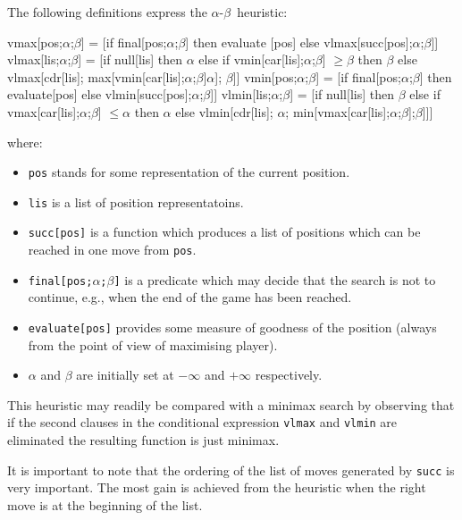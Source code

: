 \documentclass{tufte-handout}
\newcommand{\alphabeta}[0]{$\alpha$-$\beta$~}
\begin{document}
The following definitions express the \alphabeta heuristic:

\begin{mexp}
  vmax[pos;$\alpha$;$\beta$] = [if final[pos;$\alpha$;$\beta$] then evaluate [pos]
                   else vlmax[succ[pos];$\alpha$;$\beta$]]
  vlmax[lis;$\alpha$;$\beta$] = [if null[lis] then $\alpha$
                   else if vmin[car[lis];$\alpha$;$\beta$] $\geq \beta$ then $\beta$
                   else vlmax[cdr[lis];
                              max[vmin[car[lis];$\alpha$;$\beta$]$\alpha$];
                              $\beta$]]
  vmin[pos;$\alpha$;$\beta$] = [if final[pos;$\alpha$;$\beta$] then evaluate[pos]                                
                   else vlmin[succ[pos];$\alpha$;$\beta$]]
  vlmin[lis;$\alpha$;$\beta$] = [if null[lis] then $\beta$
                   else if vmax[car[lis];$\alpha$;$\beta$] $\leq \alpha$ then $\alpha$
                   else vlmin[cdr[lis];
                              $\alpha$;
                              min[vmax[car[lis];$\alpha$;$\beta$];$\beta$]]]
\end{mexp}
where:
\begin{itemize}
\item[] \texttt{pos} stands for some representation of the current position.
\item[] \texttt{lis} is a list of position representatoins.
\item[] \texttt{succ[pos]} is a function which produces a list of positions
  which can be reached in one move from \texttt{pos}.
\item[] \texttt{final[pos;$\alpha$;$\beta$]} is a predicate which may decide
  that the search is not to continue, e.g., when the end of the game has been
  reached.
\item[] \texttt{evaluate[pos]} provides some measure of goodness of the position
  (always from the point of view of maximising player).
\item[] $\alpha$ and $\beta$ are initially set at $-\infty$ and $+\infty$ respectively.
\end{itemize}

This heuristic may readily be compared with a minimax search by observing that
if the second clauses in the conditional expression \texttt{vlmax} and
\texttt{vlmin} are eliminated the resulting function is just minimax.

It is important to note that the ordering of the list of moves generated by
\texttt{succ} is very important. The most gain is achieved from the heuristic
when the right move is at the beginning of the list.
\end{document}
